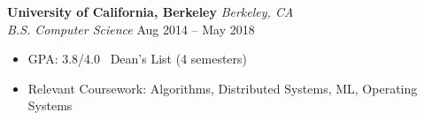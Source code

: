 \documentclass[10pt, letterpaper]{article}
\newcommand{\eduentry}[4]{%
  \vspace{4pt}
  \textbf{#1} \hfill \textit{#3} \\
  \textit{#2} \hfill \small{#4}
  \vspace{1pt}
}
\begin{document}
\eduentry{University of California, Berkeley}{B.S. Computer Science}{Berkeley, CA}{Aug 2014 -- May 2018}
\begin{itemize}
  \item GPA: 3.8/4.0 \textbar\ Dean's List (4 semesters)
  \item Relevant Coursework: Algorithms, Distributed Systems, ML, Operating Systems
\end{itemize}

\end{document}
